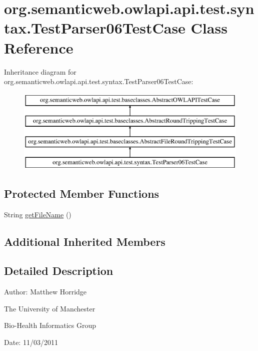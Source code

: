 \hypertarget{classorg_1_1semanticweb_1_1owlapi_1_1api_1_1test_1_1syntax_1_1_test_parser06_test_case}{\section{org.\-semanticweb.\-owlapi.\-api.\-test.\-syntax.\-Test\-Parser06\-Test\-Case Class Reference}
\label{classorg_1_1semanticweb_1_1owlapi_1_1api_1_1test_1_1syntax_1_1_test_parser06_test_case}
}
Inheritance diagram for org.\-semanticweb.\-owlapi.\-api.\-test.\-syntax.\-Test\-Parser06\-Test\-Case\-:\begin{figure}[H]
\begin{center}
\leavevmode
\includegraphics[height=4.000000cm]{classorg_1_1semanticweb_1_1owlapi_1_1api_1_1test_1_1syntax_1_1_test_parser06_test_case}
\end{center}
\end{figure}
\subsection*{Protected Member Functions}
\begin{DoxyCompactItemize}
\item 
String \hyperlink{classorg_1_1semanticweb_1_1owlapi_1_1api_1_1test_1_1syntax_1_1_test_parser06_test_case_a68981ecf4ed6f3d02d90de00f77c03ad}{get\-File\-Name} ()
\end{DoxyCompactItemize}
\subsection*{Additional Inherited Members}


\subsection{Detailed Description}
Author\-: Matthew Horridge\par
 The University of Manchester\par
 Bio-\/\-Health Informatics Group\par
 Date\-: 11/03/2011 

